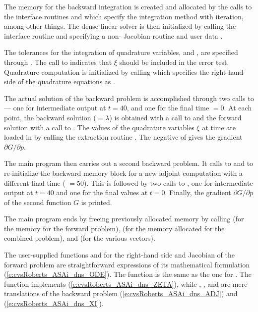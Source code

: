 The {\cvodes} memory for the backward integration is created and allocated
by the calls to the interface routines  and  which 
specify the  integration method with  iteration, among
other things.  The dense linear solver {\cvdense} is then initialized by calling
the  interface routine and specifying a non- Jacobian routine
 and user data .

The tolerances for the integration of quadrature variables,  and
, are specified through .
The call to  indicates that $\xi$ should be included
in the error test.
Quadrature computation is initialized by calling 
which specifies the right-hand side of the quadrature equations as .

The actual solution of the backward problem is accomplished through
two calls to  --- one for intermediate output at $t = 40$,
and one for the final time  $= 0$.  At each point, the backward
solution  ($ = \lambda$) is obtained with a call to  and the
forward solution with a call to .  The values of the
quadrature variables $\xi$ at time  are loaded in  by calling
the extraction routine . The negative of 
gives the gradient $\partial G / \partial p$.

The main program then carries out a second backward problem.
It calls to  and  to re-initialize the 
backward memory block for a new adjoint computation with a different final 
time ( $= 50$).  This is followed by two calls to ,
one for intermediate output at $t = 40$ and one for the final values at
$t = 0$.  Finally, the gradient $\partial G / \partial p$ of the second
function $G$ is printed.

The main program ends by freeing previously allocated memory by calling 
 (for the {\cvodes} memory for the forward problem),  
(for the memory allocated for the combined problem), and  
(for the various vectors).

The user-supplied functions  and  for the right-hand side and
Jacobian of the forward problem are straightforward expressions of its 
mathematical formulation (\ref{e:cvsRoberts_ASAi_dns_ODE}). 
The function  is the same as the one for .
The function  implements
(\ref{e:cvsRoberts_ASAi_dns_ZETA}), while , , and  are mere
translations of the backward problem (\ref{e:cvsRoberts_ASAi_dns_ADJ}) and
(\ref{e:cvsRoberts_ASAi_dns_XI}).

